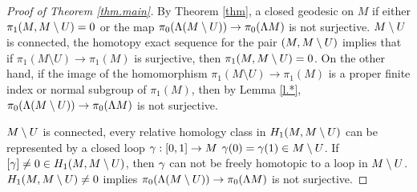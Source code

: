 \documentclass[11pt,twoside]{article}
\begin{document}
\begin{proof}[Proof of Theorem \ref{thm.main}] By Theorem \ref{thm}, \tes a closed geodesic on $M$ if either \(\pi_1(M,M \setminus U)=0\) or the map \(\pi_0(\Lambda (M \setminus U))\rightarrow \pi_0(\Lambda M)\) is not surjective. \Sn $M \setminus U$ is connected, the homotopy exact sequence for the pair $(M,M \setminus U)$ implies that if $\pi_1(M\setminus U)\rightarrow \pi_1(M)$ is surjective, then  \(\pi_1(M,M \setminus U)=0\). On the other hand, if the image of the homomorphism $\pi_1(M\setminus U)\rightarrow \pi_1(M)$ is a proper finite index or normal subgroup of $\pi_1(M)$, then by Lemma \ref{l.*}, \(\pi_0(\Lambda (M \setminus U))\rightarrow \pi_0(\Lambda M)\) is not surjective. 
	
\Sn $M \setminus U$ is connected, every relative homology class in \(H_1(M,M \setminus U)\) can be represented by a closed loop \(\gamma:[0,1]\rightarrow M\) \st \(\gamma(0)=\gamma(1)\in M \setminus U\). If \([\gamma]\neq 0\in H_1(M,M \setminus U)\), then \(\gamma\) can not be freely homotopic to a loop in \(M \setminus U\). \tf $H_1(M,M \setminus U)\neq 0$ implies \(\pi_0(\Lambda (M \setminus U))\rightarrow \pi_0(\Lambda M)\) is not surjective.

\end{proof}
\medskip



\end{document}
